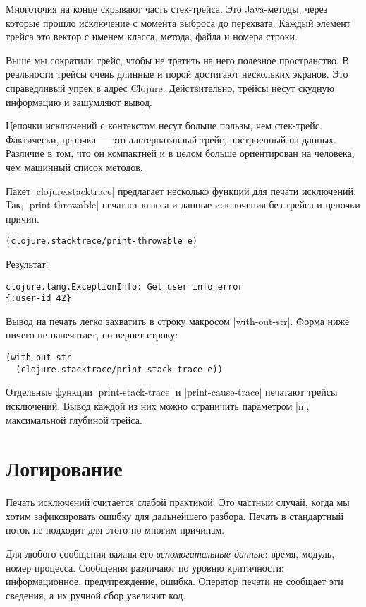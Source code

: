 Многоточия на конце скрывают часть стек-трейса. Это Java-методы, через которые
прошло исключение с момента выброса до перехвата. Каждый элемент трейса это
вектор с именем класса, метода, файла и номера строки.

Выше мы сократили трейс, чтобы не тратить на него полезное пространство. В
реальности трейсы очень длинные и порой достигают нескольких экранов. Это
справедливый упрек в адрес Clojure. Действительно, трейсы несут скудную
информацию и зашумляют вывод.

Цепочки исключений с контекстом несут больше пользы, чем стек-трейс. Фактически,
цепочка — это альтернативный трейс, построенный на данных. Различие в том, что
он компактней и в целом больше ориентирован на человека, чем машинный список
методов.

Пакет \spverb|clojure.stacktrace| предлагает несколько функций для печати
исключений. Так, \spverb|print-throwable| печатает класса и данные исключения без
трейса и цепочки причин.

\begin{verbatim}
(clojure.stacktrace/print-throwable e)
\end{verbatim}

Результат:

\begin{verbatim}
clojure.lang.ExceptionInfo: Get user info error
{:user-id 42}
\end{verbatim}

Вывод на печать легко захватить в строку макросом \spverb|with-out-str|. Форма ниже
ничего не напечатает, но вернет строку:

\begin{verbatim}
(with-out-str
  (clojure.stacktrace/print-stack-trace e))
\end{verbatim}

Отдельные функции \spverb|print-stack-trace| и \spverb|print-cause-trace| печатают трейсы
исключений. Вывод каждой из них можно ограничить параметром \spverb|n|, максимальной
глубиной трейса.

\section{Логирование}

Печать исключений считается слабой практикой. Это частный случай, когда мы хотим
зафиксировать ошибку для дальнейшего разбора. Печать в стандартный поток не
подходит для этого по многим причинам.

Для любого сообщения важны его \emph{вспомогательные данные}: время, модуль, номер
процесса. Сообщения различают по уровню критичности: информационное,
предупреждение, ошибка. Оператор печати не сообщает эти сведения, а их ручной
сбор увеличит код.

